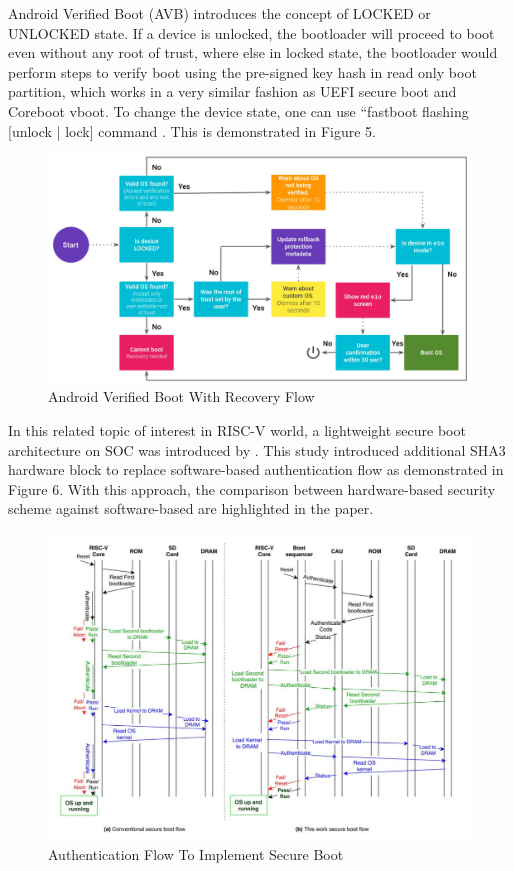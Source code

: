 \documentclass[review]{elsarticle}
\begin{document}
Android Verified Boot (AVB) introduces the concept of LOCKED or UNLOCKED state. If a device is unlocked, the bootloader will proceed to boot even without any root of trust, where else in locked state, the bootloader would perform steps to verify boot using the pre-signed key hash in read only boot partition, which works in a very similar fashion as UEFI secure boot and Coreboot vboot. To change the device state, one can use “fastboot flashing [unlock | lock] command \cite{R5:17}. This is demonstrated in Figure 5.


\begin{figure}[H]
	\centering
	\includegraphics[width=1\textwidth]{figs/AndroidVerifiedBootWithRecoveryFlow.JPG}
	\caption{Android Verified Boot With Recovery Flow \cite{R5:17}}
\end{figure}



In this related topic of interest in RISC-V world, a lightweight secure boot architecture on SOC was
introduced by \cite{R5:12}. This study
introduced additional SHA3 hardware block to replace software-based authentication flow as
demonstrated in Figure 6. With this approach, the comparison between hardware-based security
scheme against software-based are highlighted in the paper.

\begin{figure}[H]
	\includegraphics[width=1\textwidth]{figs/AuthenticationFlowToImplementSecureBoot.JPG}
	\caption{Authentication Flow To Implement Secure Boot \cite{R5:12}}
\end{figure}
\end{document}
